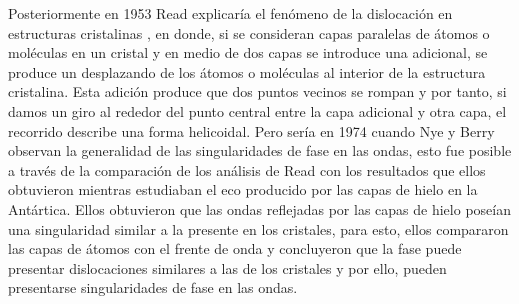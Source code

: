 
Posteriormente en 1953 Read explicaría el fenómeno de la dislocación en estructuras cristalinas \cite{Read1953}, en donde, si se consideran capas paralelas de átomos o moléculas en un cristal y en  medio de dos capas se introduce una adicional, se produce un desplazando de los átomos o moléculas al interior de la estructura cristalina. Esta adición produce que dos puntos vecinos se rompan y por tanto, si damos un giro al rededor del punto central entre la capa adicional y otra capa, el recorrido describe una forma helicoidal. Pero sería en 1974 cuando Nye y Berry \cite{Nye1974} observan la generalidad de las singularidades de fase en las ondas, esto fue posible a través de la comparación de los análisis de Read con los resultados que ellos obtuvieron mientras estudiaban el eco producido por las capas de hielo en la Antártica. Ellos obtuvieron que las ondas reflejadas por las capas de hielo poseían una singularidad similar a la presente en los cristales, para esto, ellos compararon las capas de átomos con el frente de onda y concluyeron que la fase puede presentar dislocaciones similares a las de los cristales y por ello, pueden presentarse singularidades de fase en las ondas.\\


